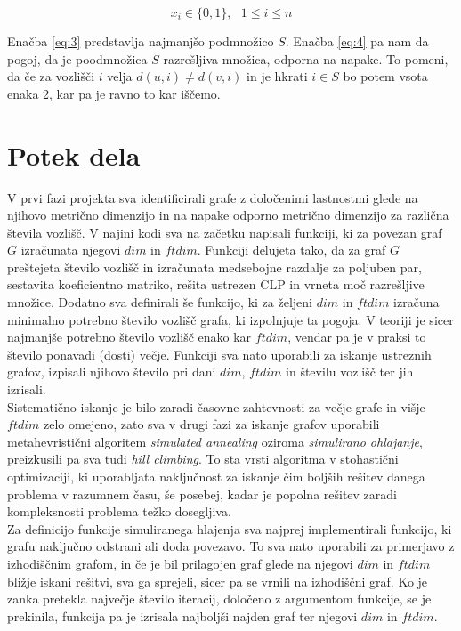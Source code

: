 \documentclass[12pt]{article}
\begin{document}
\begin{equation}
    x_i \in \{0, 1\}, \text{ } 1 \leq i \leq n
\label{eq:5}
\end{equation}

Enačba \eqref{eq:3} predstavlja najmanjšo podmnožico $S.$ Enačba \eqref{eq:4} pa nam da pogoj, da
je poodmnožica $S$ razrešljiva množica, odporna na napake. To pomeni, da če za vozlišči $i$ velja 
$d(u, i) \neq d(v, i)$ in je hkrati $i \in S$ bo potem vsota enaka 2, kar pa je ravno to kar iščemo.

\section{Potek dela}

V prvi fazi projekta sva identificirali grafe z določenimi lastnostmi glede na njihovo metrično dimenzijo in na napake odporno metrično dimenzijo za različna števila vozlišč. V najini kodi sva na začetku napisali funkciji, ki za povezan graf $G$ izračunata njegovi $dim$ in $ftdim$. Funkciji delujeta tako, da za graf $G$ preštejeta število vozlišč in izračunata medsebojne razdalje za poljuben par, sestavita koeficientno matriko, rešita ustrezen CLP in vrneta moč razrešljive množice. Dodatno sva definirali še funkcijo, ki za željeni $dim$ in $ftdim$ izračuna minimalno potrebno število vozlišč grafa, ki izpolnjuje ta pogoja. V teoriji je sicer najmanjše potrebno število vozlišč enako kar $ftdim$, vendar pa je v praksi to število ponavadi (dosti) večje. Funkciji sva nato uporabili za iskanje ustreznih grafov, izpisali njihovo število pri dani $dim$, $ftdim$ in številu vozlišč ter jih izrisali. \\[0.5em]
Sistematično iskanje je bilo zaradi časovne zahtevnosti za večje grafe in višje $ftdim$ zelo omejeno, zato sva v drugi fazi za iskanje grafov uporabili metahevristični algoritem \textit{simulated annealing} oziroma \textit{simulirano ohlajanje}, preizkusili pa sva tudi \textit{hill climbing}. To sta vrsti algoritma v stohastični optimizaciji, ki uporabljata naključnost za iskanje čim boljših rešitev danega problema v razumnem času, še posebej, kadar je popolna rešitev zaradi kompleksnosti problema težko dosegljiva. \\
Za definicijo funkcije simuliranega hlajenja sva najprej implementirali funkcijo, ki grafu naključno odstrani ali doda povezavo. To sva nato uporabili za primerjavo z izhodiščnim grafom, in če je bil prilagojen graf glede na njegovi $dim$ in $ftdim$ bližje iskani rešitvi, sva ga sprejeli, sicer pa se vrnili na izhodiščni graf. Ko je zanka pretekla največje število iteracij, določeno z argumentom funkcije, se je prekinila, funkcija pa je izrisala najboljši najden graf ter njegovi $dim$ in $ftdim$.
\end{document}
